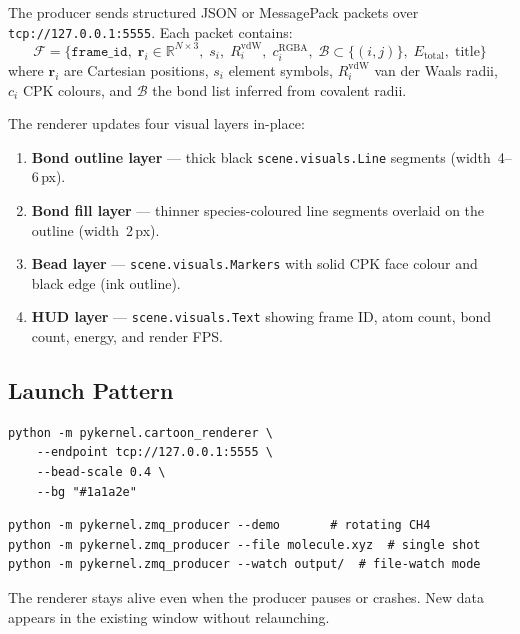 \documentclass[11pt,a4paper]{article}
\begin{document}
The producer sends structured JSON or MessagePack packets over
\texttt{tcp://127.0.0.1:5555}.  Each packet contains:
\begin{equation}
  \mathcal{F} = \bigl\{
    \mathtt{frame\_id},\;
    \bm{r}_i \in \mathbb{R}^{N\times 3},\;
    s_i,\;
    R_i^{\text{vdW}},\;
    c_i^{\text{RGBA}},\;
    \mathcal{B} \subset \{(i,j)\},\;
    E_{\text{total}},\;
    \text{title}
  \bigr\}
\end{equation}
where $\bm{r}_i$ are Cartesian positions, $s_i$ element symbols,
$R_i^{\text{vdW}}$ van der Waals radii, $c_i$ CPK colours, and
$\mathcal{B}$ the bond list inferred from covalent radii.

The renderer updates four visual layers in-place:
\begin{enumerate}
  \item \textbf{Bond outline layer} --- thick black
        \texttt{scene.visuals.Line} segments (width~4--6\,px).
  \item \textbf{Bond fill layer} --- thinner species-coloured line
        segments overlaid on the outline (width~2\,px).
  \item \textbf{Bead layer} --- \texttt{scene.visuals.Markers} with
        solid CPK face colour and black edge (ink outline).
  \item \textbf{HUD layer} --- \texttt{scene.visuals.Text} showing
        frame ID, atom count, bond count, energy, and render FPS.
\end{enumerate}

\subsection{Launch Pattern}

\begin{lstlisting}[title={\textbf{Terminal 1 --- Start renderer (persistent window)}}]
python -m pykernel.cartoon_renderer \
    --endpoint tcp://127.0.0.1:5555 \
    --bead-scale 0.4 \
    --bg "#1a1a2e"
\end{lstlisting}

\begin{lstlisting}[title={\textbf{Terminal 2 --- Start producer (data source)}}]
python -m pykernel.zmq_producer --demo       # rotating CH4
python -m pykernel.zmq_producer --file molecule.xyz  # single shot
python -m pykernel.zmq_producer --watch output/  # file-watch mode
\end{lstlisting}

The renderer stays alive even when the producer pauses or crashes.
New data appears in the existing window without relaunching.
\end{document}
